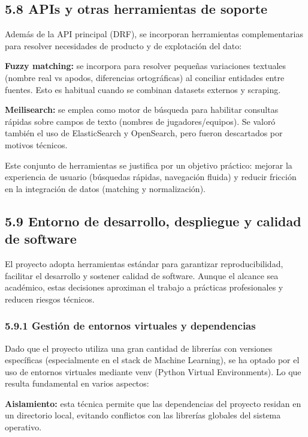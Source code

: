 \subsection{5.8 APIs y otras herramientas de soporte}

Además de la API principal (DRF), se incorporan herramientas complementarias para resolver 
necesidades de producto y de explotación del dato:

\textbf{Fuzzy matching:} se incorpora para resolver pequeñas variaciones textuales (nombre real vs 
apodos, diferencias ortográficas) al conciliar entidades entre fuentes. Esto es habitual cuando se 
combinan datasets externos y scraping.

\textbf{Meilisearch:} se emplea como motor de búsqueda para habilitar consultas rápidas sobre campos 
de texto (nombres de jugadores/equipos). Se valoró también el uso de ElasticSearch y OpenSearch, pero fueron descartados por motivos técnicos.

Este conjunto de herramientas se justifica por un objetivo práctico: mejorar la experiencia de usuario 
(búsquedas rápidas, navegación fluida) y reducir fricción en la integración de datos (matching y 
normalización).

\subsection{5.9 Entorno de desarrollo, despliegue y calidad de software}

El proyecto adopta herramientas estándar para garantizar reproducibilidad, facilitar el desarrollo 
y sostener calidad de software. Aunque el alcance sea académico, estas decisiones aproximan el 
trabajo a prácticas profesionales y reducen riesgos técnicos.

\subsubsection{5.9.1 Gestión de entornos virtuales y dependencias}

Dado que el proyecto utiliza una gran cantidad de librerías con versiones específicas (especialmente 
en el stack de Machine Learning), se ha optado por el uso de entornos virtuales mediante venv 
(Python Virtual Environments). Lo que resulta fundamental en varios aspectos:

\textbf{Aislamiento:} esta técnica permite que las dependencias del proyecto residan en un directorio 
local, evitando conflictos con las librerías globales del sistema operativo.

